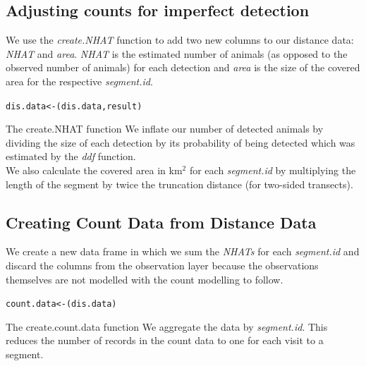 
\subsection{Adjusting counts for imperfect detection}
\noindent We use the \textit{create.NHAT} function to add two new columns to our distance data: \textit{NHAT} and \textit{area}. \textit{NHAT} is the estimated number of animals (as opposed to the observed number of animals) for each detection and \textit{area} is the size of the covered area for the respective \textit{segment.id}.\\
\begin{knitrout}\footnotesize
{}\color{fgcolor}
\begin{kframe}
\begin{alltt}
dis.data <- (dis.data,result)
\end{alltt}
\end{kframe}
\end{knitrout}
\begin{block}{The create.NHAT function}
We inflate our number of detected animals by dividing the size of each detection by its probability of being detected which was estimated by the \textit{ddf} function.\\
We also calculate the covered area in km$^2$ for each \textit{segment.id} by multiplying the length of the segment by twice the truncation distance (for two-sided transects). 
\end{block}

\subsection{Creating Count Data from Distance Data}
\noindent We create a new data frame in which we sum the \textit{NHATs} for each \textit{segment.id} and discard the columns from the observation layer because the observations themselves are not modelled with the count modelling to follow. 
\begin{knitrout}\footnotesize
{}\color{fgcolor}
\begin{kframe}
\begin{alltt}
count.data <- (dis.data)
\end{alltt}
\end{kframe}
\end{knitrout}
\begin{block}{The create.count.data function}
We aggregate the data by \textit{segment.id}. This reduces the number of records in the count data to one for each visit to a segment. 
\end{block}


